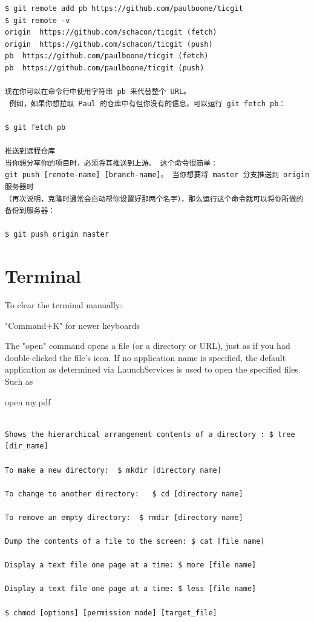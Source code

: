 \begin{verbatim}
$ git remote add pb https://github.com/paulboone/ticgit
$ git remote -v
origin	https://github.com/schacon/ticgit (fetch)
origin	https://github.com/schacon/ticgit (push)
pb	https://github.com/paulboone/ticgit (fetch)
pb	https://github.com/paulboone/ticgit (push)

现在你可以在命令行中使用字符串 pb 来代替整个 URL。
 例如，如果你想拉取 Paul 的仓库中有但你没有的信息，可以运行 git fetch pb：

$ git fetch pb

推送到远程仓库
当你想分享你的项目时，必须将其推送到上游。 这个命令很简单：
git push [remote-name] [branch-name]。 当你想要将 master 分支推送到 origin 服务器时
（再次说明，克隆时通常会自动帮你设置好那两个名字），那么运行这个命令就可以将你所做的备份到服务器：

$ git push origin master

\end{verbatim}





\section{Terminal}

To clear the terminal manually:


"Command+K"  for newer keyboards


The "open" command opens a file (or a directory or URL), just as if you had double-clicked the file's icon. If no application name is specified, the default application as determined via LaunchServices is used to open the specified files. Such as

open my.pdf

\begin{verbatim}

Shows the hierarchical arrangement contents of a directory : $ tree [dir_name]

To make a new directory:  $ mkdir [directory name]

To change to another directory:   $ cd [directory name]

To remove an empty directory:  $ rmdir [directory name]

Dump the contents of a file to the screen: $ cat [file name]

Display a text file one page at a time: $ more [file name]

Display a text file one page at a time: $ less [file name]

$ chmod [options] [permission mode] [target_file]


\end{verbatim}


